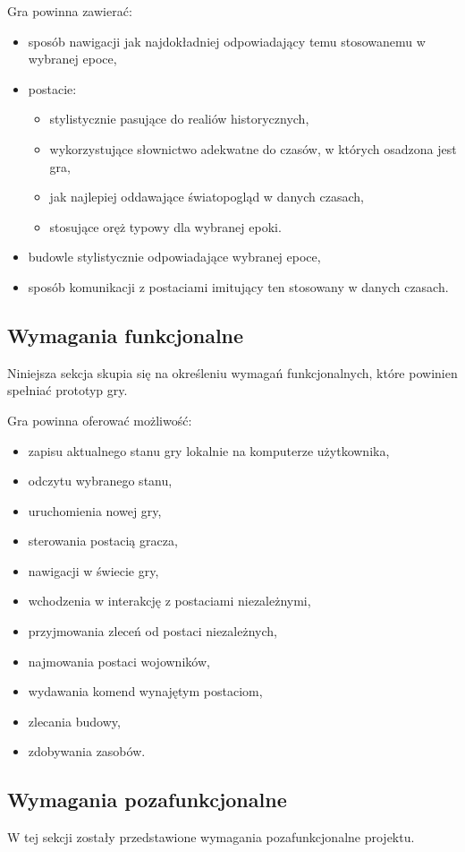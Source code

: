 Gra powinna zawierać:
\begin{itemize}
  \item sposób nawigacji jak najdokładniej odpowiadający temu stosowanemu w wybranej epoce,
  \item postacie:
  \begin{itemize}
    \item stylistycznie pasujące do realiów historycznych,
    \item wykorzystujące słownictwo adekwatne do czasów, w których osadzona jest gra,
    \item jak najlepiej oddawające światopogląd w danych czasach,
    \item stosujące oręż typowy dla wybranej epoki.
  \end{itemize}
  \item budowle stylistycznie odpowiadające wybranej epoce,
  \item sposób komunikacji z postaciami imitujący ten stosowany w danych czasach.
\end{itemize}

\subsection{Wymagania funkcjonalne}\label{ss:fun}
Niniejsza sekcja skupia się na określeniu wymagań funkcjonalnych, które powinien spełniać prototyp gry.

Gra powinna oferować możliwość:
\begin{itemize}\label{list:fun}
  \item zapisu aktualnego stanu gry lokalnie na komputerze użytkownika,
  \item odczytu wybranego stanu,
  \item uruchomienia nowej gry,
  \item sterowania postacią gracza,
  \item nawigacji w świecie gry,
  \item wchodzenia w interakcję z postaciami niezależnymi,
  \item przyjmowania zleceń od postaci niezależnych,
  \item najmowania postaci wojowników,
  \item wydawania komend wynajętym postaciom,
  \item zlecania budowy,
  \item zdobywania zasobów.
\end{itemize}

\subsection{Wymagania pozafunkcjonalne}\label{ss:nonfun}
W tej sekcji zostały przedstawione wymagania pozafunkcjonalne projektu.

